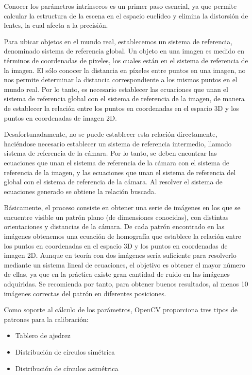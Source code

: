 Conocer los parámetros intrínsecos es un primer paso esencial, ya que permite calcular la estructura de la escena en el espacio euclídeo y elimina la distorsión de lentes, la cual afecta a la precisión.

Para ubicar objetos en el mundo real, establecemos un sistema de referencia, denominado sistema de referencia global. Un objeto en una imagen es medido en términos de coordenadas de píxeles, los cuales están en el sistema de referencia de la imagen. El sólo conocer la distancia en píxeles entre puntos en una imagen, no nos permite determinar la distancia correspondiente a los mismos puntos en el mundo real. Por lo tanto, es necesario establecer las ecuaciones que unan el sistema de referencia global con el sistema de referencia de la imagen, de manera de establecer la relación entre los puntos en coordenadas en el espacio 3D y los puntos en coordenadas de imagen 2D. 

Desafortunadamente, no se puede establecer esta relación directamente, haciéndose necesario establecer un sistema de referencia intermedio, llamado sistema de referencia de la cámara. Por lo tanto, se deben encontrar las ecuaciones que unan el sistema de referencia de la cámara con el sistema de referencia de la imagen, y las ecuaciones que unan el sistema  de referencia del global con el sistema de referencia de la cámara. Al resolver el sistema de ecuaciones generado se obtiene la relación buscada.

Básicamente, el proceso consiste en obtener una serie de imágenes en los que se encuentre visible un patrón plano (de dimensiones conocidas), con distintas orientaciones y distancias de la cámara. De cada patrón encontrado en las imágenes obtenemos una ecuación de homografía que establece la relación entre los puntos en coordenadas en el espacio 3D y los puntos en coordenadas de imagen 2D. Aunque en teoría con dos imágenes sería suficiente para resolverlo mediante un sistema lineal de ecuaciones, el objetivo es obtener el mayor número de ellas, ya que en la práctica existe gran cantidad de ruido en las imágenes adquiridas. Se recomienda por tanto, para obtener buenos resultados, al menos 10 imágenes correctas del patrón en diferentes posiciones.

Como soporte al cálculo de los parámetros, OpenCV proporciona tres tipos de patrones para la calibración:

\begin{itemize}
\item Tablero de ajedrez
\item Distribución de círculos simétrica
\item Distribución de círculos asimétrica 
\end{itemize}


